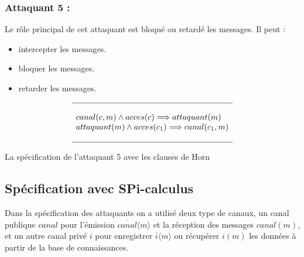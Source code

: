 \documentclass[10pt,a4paper]{article}
\begin{document}
\subsubsection{Attaquant 5 :}
Le rôle principal de cet attaquant est bloqué ou retardé les messages. Il peut :
\begin{itemize}
\item intercepter les messages.
\item bloquer les messages.
\item retarder les messages.\\
\end{itemize}
\[
\begin{array}{l}
\hline
\\
canal(c,m)\wedge acces(c)\Longrightarrow attaquant(m)\\
attaquant(m)\wedge acces(c_{1})\Longrightarrow canal(c_{1},m)\\
\\
\hline 
\end{array}
\]
\caption{La spécification de l'attaquant 5 avec les clauses de Horn}

\subsection{Spécification avec SPi-calculus}
Dans la spécification des attaquants on a utilisé deux type de canaux, un canal publique $canal$ pour l'émission $\overline{canal}\langle m\rangle$ et la réception des messages $canal(m)$, et un autre canal privé $i$ pour enregistrer $\overline{i}\langle m\rangle$ ou récupérer $i(m)$ les données à partir de la base de connaissances. 
\end{document}
